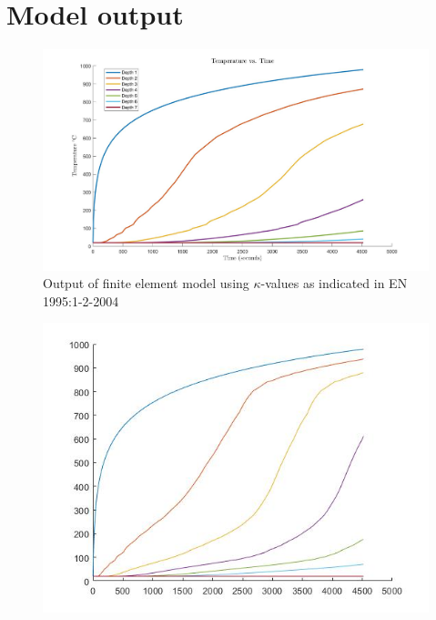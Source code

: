 \section{Model output}
\begin{figure}[H]
	\label{og_modeldata}
	\centering
	\includegraphics[width=5.5in,]{figures/originalmugraph.jpg}
	\caption{Output of finite element model using $\kappa$-values as indicated in EN 1995:1-2-2004}
\end{figure}

\begin{figure}[H]
	\label{data_newk}
	\centering
	\includegraphics[width=5.5in,]{figures/rough_average_graph.jpg}
\end{figure}
